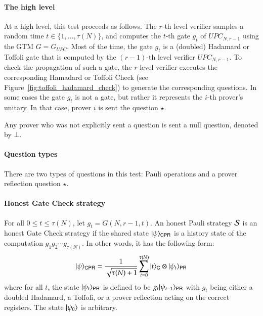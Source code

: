 \paragraph{The high level}  At a high level, this test  proceeds as follows. The $r$-th level verifier samples a random time $t \in \{1,\ldots,\tau(N)\}$, and computes the $t$-th gate $g_t$ of $UPC_{N,r-1}$ using the GTM $G = G_{UPC}$. Most of the time, the gate $g_t$ is a (doubled) Hadamard or Toffoli gate that is computed by the $(r-1)$-th level verifier $UPC_{N,r-1}$. To check the propagation of such a gate, the $r$-level verifier executes the corresponding Hamadard or Toffoli Check (see Figure~\ref{fig:toffoli_hadamard_check}) to generate the corresponding questions. In some cases the gate $g_t$ is not a gate, but rather it represents the $i$-th prover's unitary. In that case, prover $i$ is sent the question $\star$.  

Any prover who was not explicitly sent a question is sent a null question, denoted by $\bot$.

\paragraph{Question types} There are two types of questions in this test: Pauli operations and a prover reflection question $\star$.

\paragraph{Honest Gate Check strategy} 

For all $0 \leq t \leq \tau(N)$, let $g_t = G(N,r-1,t)$. An honest Pauli strategy $\mathcal{S}$ is an honest Gate Check strategy if the shared state $|\psi\rangle_{{\mathsf{C}} {\mathsf{P}} {\mathsf{R}}}$ is a history state of the computation $g_1g_2\cdots g_{\tau(N)}$. In other words, it has the following form:
\[
	|\psi\rangle_{{\mathsf{C}} {\mathsf{P}} {\mathsf{R}}} = \frac{1}{\sqrt{\tau(N) + 1}} \sum_{t = 0}^{\tau(N)} |t\rangle_{{\mathsf{C}}} \otimes |\psi_t\rangle_{{\mathsf{P}} {\mathsf{R}}}
\]
where for all $t$, the state $|\psi_t\rangle_{{\mathsf{P}} {\mathsf{R}}}$ is defined to be $g_t |\psi_{t-1}\rangle_{{\mathsf{P}} {\mathsf{R}}}$ with $g_t$ being either a doubled Hadamard, a Toffoli, or a prover reflection acting on the correct registers. The state $|\psi_0\rangle$ is arbitrary.  %

